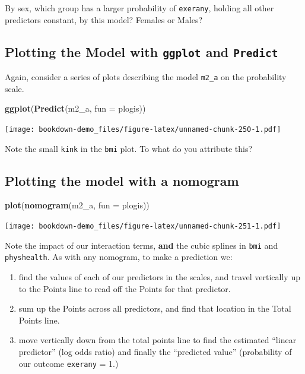 \documentclass[]{book}
\newenvironment{Shaded}{\begin{snugshade}}{\end{snugshade}}
\newcommand{\KeywordTok}[1]{\textcolor[rgb]{0.13,0.29,0.53}{\textbf{#1}}}
\newcommand{\DataTypeTok}[1]{\textcolor[rgb]{0.13,0.29,0.53}{#1}}
\newcommand{\NormalTok}[1]{#1}
\providecommand{\tightlist}{%
  \setlength{\itemsep}{0pt}\setlength{\parskip}{0pt}}
\theoremstyle{definition}
\theoremstyle{definition}
\theoremstyle{definition}
\theoremstyle{remark}
\begin{document}
By sex, which group has a larger probability of \texttt{exerany},
holding all other predictors constant, by this model? Females or Males?

\subsection{\texorpdfstring{Plotting the Model with \texttt{ggplot} and
\texttt{Predict}}{Plotting the Model with ggplot and Predict}}\label{plotting-the-model-with-ggplot-and-predict-1}

Again, consider a series of plots describing the model \texttt{m2\_a} on
the probability scale.

\begin{Shaded}
\begin{Highlighting}[]
\KeywordTok{ggplot}\NormalTok{(}\KeywordTok{Predict}\NormalTok{(m2_a, }\DataTypeTok{fun =}\NormalTok{ plogis))}
\end{Highlighting}
\end{Shaded}

\texttt{[image: bookdown-demo\_files/figure-latex/unnamed-chunk-250-1.pdf]}

Note the small \texttt{kink} in the \texttt{bmi} plot. To what do you
attribute this?

\subsection{Plotting the model with a
nomogram}\label{plotting-the-model-with-a-nomogram-1}

\begin{Shaded}
\begin{Highlighting}[]
\KeywordTok{plot}\NormalTok{(}\KeywordTok{nomogram}\NormalTok{(m2_a, }\DataTypeTok{fun =}\NormalTok{ plogis))}
\end{Highlighting}
\end{Shaded}

\texttt{[image: bookdown-demo\_files/figure-latex/unnamed-chunk-251-1.pdf]}

Note the impact of our interaction terms, \textbf{and} the cubic splines
in \texttt{bmi} and \texttt{physhealth}. As with any nomogram, to make a
prediction we:

\begin{enumerate}
\def\labelenumi{\arabic{enumi}.}
\tightlist
\item
  find the values of each of our predictors in the scales, and travel
  vertically up to the Points line to read off the Points for that
  predictor.
\item
  sum up the Points across all predictors, and find that location in the
  Total Points line.
\item
  move vertically down from the total points line to find the estimated
  ``linear predictor'' (log odds ratio) and finally the ``predicted
  value'' (probability of our outcome \texttt{exerany} = 1.)
\end{enumerate}
\end{document}
